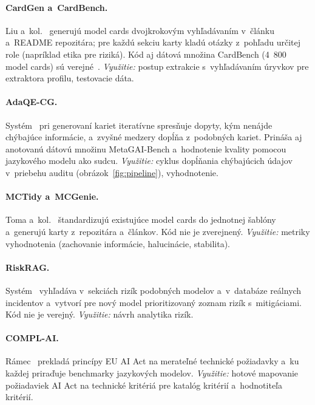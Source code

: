 \paragraph{CardGen a~CardBench.} Liu a~kol.~\cite{liu2024} generujú model
cards dvojkrokovým vyhľadávaním v~článku a~README repozitára; pre každú
sekciu karty kladú otázky z~pohľadu určitej role (napríklad etika pre
riziká). Kód aj dátová množina CardBench (4~800 model cards) sú
verejné~\cite{cardgen-code}. \emph{Využitie:} postup extrakcie
s~vyhľadávaním úryvkov pre extraktora profilu, testovacie dáta.

\paragraph{AdaQE-CG.} Systém~\cite{zhang2026adaqe} pri generovaní kariet
iteratívne spresňuje dopyty, kým nenájde chýbajúce informácie, a~zvyšné
medzery dopĺňa z~podobných kariet. Prináša aj anotovanú dátovú množinu
MetaGAI-Bench a~hodnotenie kvality pomocou jazykového modelu ako sudcu.
\emph{Využitie:} cyklus dopĺňania chýbajúcich údajov v~priebehu auditu
(obrázok~\ref{fig:pipeline}), vyhodnotenie.

\paragraph{MCTidy a~MCGenie.} Toma a~kol.~\cite{toma2026} štandardizujú
existujúce model cards do jednotnej šablóny a~generujú karty z~repozitára
a~článkov. Kód nie je zverejnený. \emph{Využitie:} metriky vyhodnotenia
(zachovanie informácie, halucinácie, stabilita).

\paragraph{RiskRAG.} Systém~\cite{rao2025} vyhľadáva v~sekciách rizík
podobných modelov a~v~databáze reálnych incidentov a~vytvorí pre nový model
prioritizovaný zoznam rizík s~mitigáciami. Kód nie je verejný.
\emph{Využitie:} návrh analytika rizík.

\paragraph{COMPL-AI.} Rámec~\cite{guldimann2024complai} prekladá princípy
EU AI Act na merateľné technické požiadavky a~ku každej priraďuje
benchmarky jazykových modelov. \emph{Využitie:} hotové mapovanie
požiadaviek AI Act na technické kritériá pre katalóg kritérií
a~hodnotiteľa kritérií.

